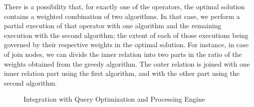 \documentclass{article}
\begin{document}
%


There is a possibility that, for exactly one of the operators, the optimal
solution contains a weighted combination of two algorithms.  In that case, we
perform a partial execution of that operator with one algorithm and the
remaining execution with the second algorithm; the extent of each of those
executions being governed by their respective weights in the optimal solution.
For instance, in case of join nodes, we can divide the inner relation into two
parts in the ratio of the weights obtained from the greedy algorithm.  The
outer relation is joined with one inner relation part using the first
algorithm, and with the other part using the second algorithm.


\begin{figure}[htpb] \centering
	

 \caption{Integration with Query Optimization and
Processing Engine} \label{fig:perf_comp} \end{figure}
\end{document}
